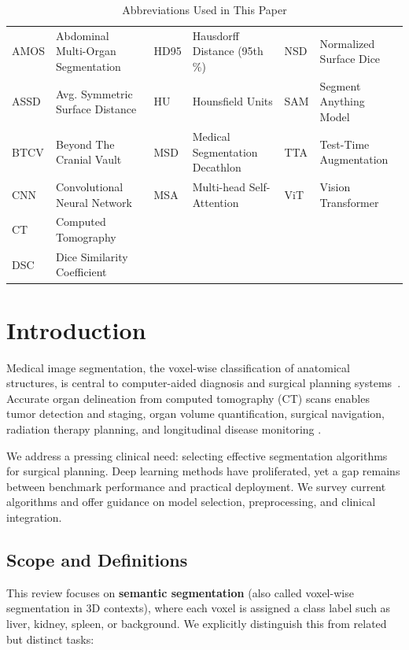\begin{table}[!htb]
\centering
\footnotesize
\caption{Abbreviations Used in This Paper}
\begin{tabular}{@{}ll|ll|ll@{}}
\toprule
AMOS & Abdominal Multi-Organ Segmentation & HD95 & Hausdorff Distance (95th \%) & NSD & Normalized Surface Dice \\
ASSD & Avg. Symmetric Surface Distance & HU & Hounsfield Units & SAM & Segment Anything Model \\
BTCV & Beyond The Cranial Vault & MSD & Medical Segmentation Decathlon & TTA & Test-Time Augmentation \\
CNN & Convolutional Neural Network & MSA & Multi-head Self-Attention & ViT & Vision Transformer \\
CT & Computed Tomography & & & & \\
DSC & Dice Similarity Coefficient & & & & \\
\bottomrule
\end{tabular}
\end{table}

\section{Introduction}
\label{sec:introduction}

Medical image segmentation, the voxel-wise classification of anatomical structures, is central to computer-aided diagnosis and surgical planning systems~\cite{litjens2017survey}. Accurate organ delineation from computed tomography (CT) scans enables tumor detection and staging, organ volume quantification, surgical navigation, radiation therapy planning, and longitudinal disease monitoring \cite{hesamian2019deep}.

We address a pressing clinical need: selecting effective segmentation algorithms for surgical planning. Deep learning methods have proliferated, yet a gap remains between benchmark performance and practical deployment. We survey current algorithms and offer guidance on model selection, preprocessing, and clinical integration.

\subsection{Scope and Definitions}

This review focuses on \textbf{semantic segmentation} (also called voxel-wise segmentation in 3D contexts), where each voxel is assigned a class label such as liver, kidney, spleen, or background. We explicitly distinguish this from related but distinct tasks:

